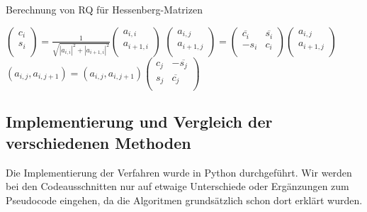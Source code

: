 \documentclass{article}
\theoremstyle{plain}
\begin{document}
\begin{algorithm}
	\label{RQ_Hessenberg}
	\caption{Berechnung von RQ für Hessenberg-Matrizen}
	\begin{algorithmic}[1]
		\State $\left(\begin{array}{c}
    c_i \\
    s_i \\
\end{array}\right)
=
\frac{1}{\sqrt{|a_{i,i}|^2 + |a_{i+1,i}|^2}}
\left(\begin{array}{c}
a_{i,i} \\
a_{i+1,i} \\
\end{array}\right)$
		\State $\left(\begin{array}{c}
		a_{i,j} \\
		a_{i+1,j}\\
		\end{array}\right)
		=
		\left(\begin{array}{cc}
		\overline{c_i} & \overline{s_i} \\
		-s_i & c_i \\
		\end{array}
		\right)
		\left(\begin{array}{c}
		a_{i,j} \\
		a_{i+1,j}\\
		\end{array}\right)$
		\EndFor
		\EndFor
			\State $\left(
			a_{i,j},
			a_{i,j+1}
			\right)
			=
			\left(
			a_{i,j},
			a_{i,j+1}
			\right)
			\left(\begin{array}{cc}
			c_j & -\overline{s_j} \\
			s_j & \overline{c_j} \\
			\end{array}
			\right)$
			\EndFor
			\EndFor
	\end{algorithmic}
\end{algorithm}

\newpage
\subsection{Implementierung und Vergleich der verschiedenen Methoden}

Die Implementierung der Verfahren wurde in Python durchgeführt. Wir werden bei den Codeausschnitten nur auf etwaige Unterschiede oder Ergänzungen zum Pseudocode eingehen, da die Algoritmen grundsätzlich schon dort erklärt wurden.\newline
\end{document}
